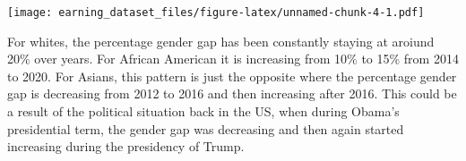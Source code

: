 \documentclass[
]{article}
\newenvironment{Shaded}{\begin{snugshade}}{\end{snugshade}}
\newcommand{\DataTypeTok}[1]{\textcolor[rgb]{0.13,0.29,0.53}{#1}}
\newcommand{\DecValTok}[1]{\textcolor[rgb]{0.00,0.00,0.81}{#1}}
\newcommand{\KeywordTok}[1]{\textcolor[rgb]{0.13,0.29,0.53}{\textbf{#1}}}
\newcommand{\NormalTok}[1]{#1}
\newcommand{\OperatorTok}[1]{\textcolor[rgb]{0.81,0.36,0.00}{\textbf{#1}}}
\newcommand{\OtherTok}[1]{\textcolor[rgb]{0.56,0.35,0.01}{#1}}
\newcommand{\StringTok}[1]{\textcolor[rgb]{0.31,0.60,0.02}{#1}}
\begin{document}
\begin{Shaded}
\end{Shaded}

\texttt{[image: earning\_dataset\_files/figure-latex/unnamed-chunk-4-1.pdf]}

For whites, the percentage gender gap has been constantly staying at
aroiund 20\% over years. For African American it is increasing from 10\%
to 15\% from 2014 to 2020. For Asians, this pattern is just the opposite
where the percentage gender gap is decreasing from 2012 to 2016 and then
increasing after 2016. This could be a result of the political situation
back in the US, when during Obama's presidential term, the gender gap
was decreasing and then again started increasing during the presidency
of Trump.
\end{document}

